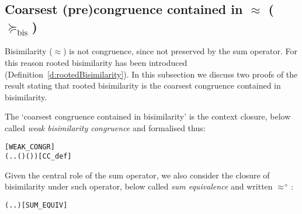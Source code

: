 
\subsection{Coarsest (pre)congruence contained in $\approx$ ($\succeq_{\mathrm{bis}}$)}
\label{s:coarsest}


Bisimilarity ($\approx$) is not  congruence, since not preserved by 
the sum operator. For this reason rooted bisimilarity has been
introduced (Definition~\ref{d:rootedBisimilarity}). 
In this subsection we discuss  two proofs of the result stating that
rooted bisimilarity is the coarsest congruence contained in
bisimilarity.

The `coarsest congruence contained in bisimilarity' is 
the context closure, below called 
\emph{weak bisimilarity congruence}   and %
formalised thus:
\begin{alltt}
 \HOLSymConst{=}  \hfill{[WEAK_CONGR]}
  \HOLSymConst{=} (\HOLTokenLambda{} . \HOLSymConst{\HOLTokenForall{}}.   \HOLSymConst{\HOLTokenImp{}}  ( ) ( ))\hfill{[CC_def]}
\end{alltt}

Given the central role of the  
 sum operator, we also consider the closure of bisimilarity under such
 operator, 
below called \emph{sum equivalence} and written $\approx^+$:
\begin{alltt}
 \HOLSymConst{=} (\HOLTokenLambda{} . \HOLSymConst{\HOLTokenForall{}}.  \HOLSymConst{+}  \HOLSymConst{\HOLTokenWeakEQ}  \HOLSymConst{+} )\hfill{[SUM_EQUIV]}
\end{alltt}


